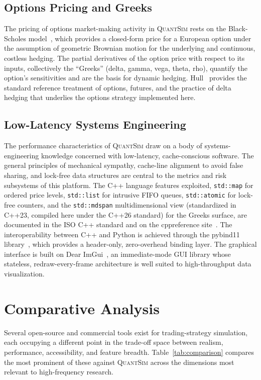 \documentclass[12pt,oneside,a4paper]{report}
\newcommand{\quantsim}{\textsc{QuantSim}}
\begin{document}
\subsection{Options Pricing and Greeks}

The pricing of options market-making activity in \quantsim{} rests on the Black-Scholes model~\cite{blackscholes1973}, which provides a closed-form price for a European option under the assumption of geometric Brownian motion for the underlying and continuous, costless hedging. The partial derivatives of the option price with respect to its inputs, collectively the ``Greeks'' (delta, gamma, vega, theta, rho), quantify the option's sensitivities and are the basis for dynamic hedging. Hull~\cite{hull2017} provides the standard reference treatment of options, futures, and the practice of delta hedging that underlies the options strategy implemented here.

\subsection{Low-Latency Systems Engineering}

The performance characteristics of \quantsim{} draw on a body of systems-engineering knowledge concerned with low-latency, cache-conscious software. The general principles of mechanical sympathy, cache-line alignment to avoid false sharing, and lock-free data structures are central to the metrics and risk subsystems of this platform. The C++ language features exploited, \texttt{std::map} for ordered price levels, \texttt{std::list} for intrusive FIFO queues, \texttt{std::atomic} for lock-free counters, and the \texttt{std::mdspan} multidimensional view (standardized in C++23, compiled here under the C++26 standard) for the Greeks surface, are documented in the ISO C++ standard and on the cppreference site~\cite{cppreference}. The interoperability between C++ and Python is achieved through the pybind11 library~\cite{pybind11}, which provides a header-only, zero-overhead binding layer. The graphical interface is built on Dear ImGui~\cite{imgui}, an immediate-mode GUI library whose stateless, redraw-every-frame architecture is well suited to high-throughput data visualization.

\section{Comparative Analysis}
\label{sec:comparative}

Several open-source and commercial tools exist for trading-strategy simulation, each occupying a different point in the trade-off space between realism, performance, accessibility, and feature breadth. Table~\ref{tab:comparison} compares the most prominent of these against \quantsim{} across the dimensions most relevant to high-frequency research.
\end{document}
